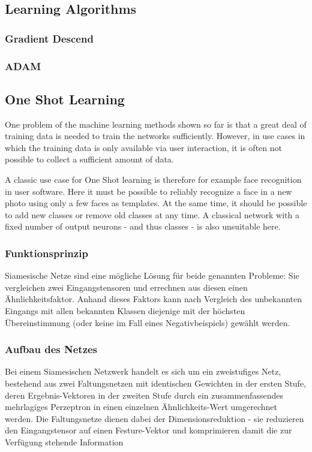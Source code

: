 		\subsection{Learning Algorithms}

		\subsubsection{Gradient Descend}
		\label{sec:gradient-descend}
		
		\subsubsection{ADAM}
		
	\subsection{ One Shot Learning }
	One problem of the machine learning methods shown so far is that a great deal of training data is needed to train the networks sufficiently. However, in use cases in which the training data is only available via user interaction, it is often not possible to collect a sufficient amount of data. 

A classic use case for One Shot learning is therefore for example face recognition in user software. Here it must be possible to reliably recognize a face in a new photo using only a few faces as templates. At the same time, it should be possible to add new classes or remove old classes at any time. A classical network with a fixed number of output neurons - and thus classes - is also unsuitable here.



	\subsubsection{Funktionsprinzip}
		Siamesische Netze sind eine mögliche Lösung für beide genannten Probleme: Sie vergleichen zwei Eingangstensoren und errechnen aus diesen einen Ähnlichkeitsfaktor. Anhand dieses Faktors kann nach Vergleich des unbekannten Eingangs mit allen bekannten Klassen diejenige mit der höchsten Übereinstimmung (oder keine im Fall eines Negativbeispiels) gewählt werden.
		
	\subsubsection{Aufbau des Netzes}
	 Bei einem Siamesischen Netzwerk handelt es sich um ein zweistufiges Netz, bestehend aus zwei Faltungsnetzen mit identischen Gewichten in der ersten Stufe, deren Ergebnis-Vektoren in der zweiten Stufe durch ein zusammenfassendes mehrlagiges Perzeptron in einen einzelnen Ähnlichkeits-Wert umgerechnet werden.
	 Die Faltungsnetze dienen dabei der Dimensionsreduktion - sie reduzieren den Eingangstensor auf einen Festure-Vektor und komprimieren damit die zur Verfügung stehende Information 
	 
